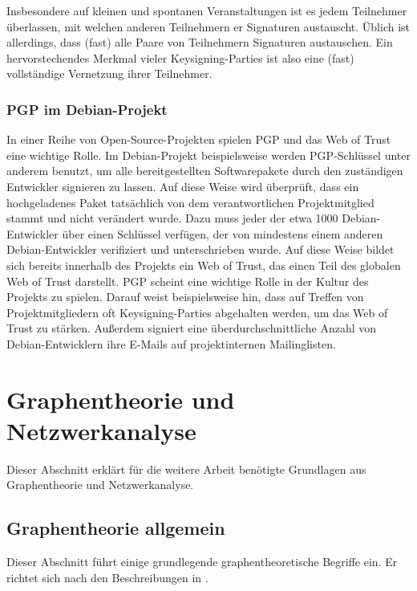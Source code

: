 Insbesondere auf kleinen und spontanen Veranstaltungen ist es jedem
Teilnehmer überlassen, mit welchen anderen Teilnehmern er Signaturen
austauscht. Üblich ist allerdings, dass (fast) alle Paare von
Teilnehmern Signaturen austauschen. Ein hervorstechendes Merkmal
vieler Keysigning-Parties ist also eine (fast) vollständige
Vernetzung ihrer Teilnehmer.

\subsubsection{PGP im Debian-Projekt}
\label{sec:foobar-fixme}

In einer Reihe von Open-Source-Projekten spielen PGP und das Web of
Trust eine wichtige Rolle. Im Debian-Projekt beispielsweise werden
PGP-Schlüssel unter anderem benutzt, um alle bereitgestellten
Softwarepakete durch den zuständigen Entwickler signieren zu
lassen. Auf diese Weise wird überprüft, dass ein hochgeladenes
Paket tatsächlich von dem verantwortlichen Projektmitglied stammt
und nicht verändert wurde. Dazu muss jeder der etwa 1000
Debian-Entwickler über einen Schlüssel verfügen, der von
mindestens einem anderen Debian-Entwickler verifiziert und
unterschrieben wurde. Auf diese Weise bildet sich bereits innerhalb
des Projekts ein Web of Trust, das einen Teil des globalen Web of
Trust darstellt. PGP scheint eine wichtige Rolle in der Kultur des
Projekts zu spielen. Darauf weist beispielsweise hin, dass auf Treffen
von Projektmitgliedern oft Keysigning-Parties abgehalten werden, um
das Web of Trust zu stärken. Außerdem signiert eine
überdurchschnittliche Anzahl von Debian-Entwicklern ihre E-Mails auf
projektinternen Mailinglisten.

\section{Graphentheorie und Netzwerkanalyse}
\label{sec:graph-und-netzw}

Dieser Abschnitt erkl\"art f\"ur die weitere Arbeit ben\"otigte
Grundlagen aus Graphentheorie und Netzwerkanalyse.

\subsection{Graphentheorie allgemein}
\label{ch:Grundlagen:sec:Graphentheorie}

Dieser Abschnitt führt einige grundlegende graphentheoretische
Begriffe ein. Er richtet sich nach den Beschreibungen in \cite{Brandes2004}.
  
